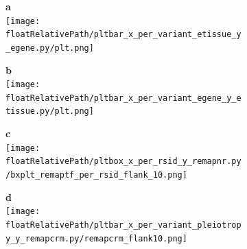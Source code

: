 %
%

\begin{figure}[!ht]

    \centering

    \begin{subfigure}[]{.49\textwidth}
        \textbf{a}
        \\
        \texttt{[image: \\floatRelativePath/pltbar\_x\_per\_variant\_etissue\_y\_egene.py/plt.png]}
    \end{subfigure}
    \begin{subfigure}[]{.49\textwidth}
        \textbf{b}
        \\
        \texttt{[image: \\floatRelativePath/pltbar\_x\_per\_variant\_egene\_y\_etissue.py/plt.png]}
    \end{subfigure}

    \begin{subfigure}[]{.49\textwidth}
        \textbf{c}
        \\
        \texttt{[image: \\floatRelativePath/pltbox\_x\_per\_rsid\_y\_remapnr.py/bxplt\_remaptf\_per\_rsid\_flank\_10.png]}
    \end{subfigure}
    \begin{subfigure}[]{.49\textwidth}
        \textbf{d}
        \\
        \texttt{[image: \\floatRelativePath/pltbar\_x\_per\_variant\_pleiotropy\_y\_remapcrm.py/remapcrm\_flank10.png]}
    \end{subfigure}

    \caption{}

\end{figure}

%
%

